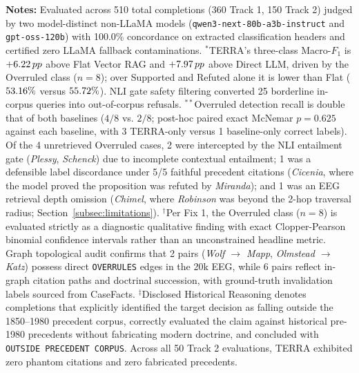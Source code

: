 \raggedright \fontsize{8.5}{10.5}\selectfont \textbf{Notes:} Evaluated across 510 total completions (360 Track 1, 150 Track 2) judged by two model-distinct non-LLaMA models (\texttt{qwen3-next-80b-a3b-instruct} and \texttt{gpt-oss-120b}) with 100.0\% concordance on extracted classification headers and certified zero LLaMA fallback contaminations.
$^*$TERRA's three-class Macro-$F_1$ is $+6.22\,pp$ above Flat Vector RAG and $+7.97\,pp$ above Direct LLM, driven by the Overruled class ($n=8$); over Supported and Refuted alone it is lower than Flat ($53.16\%$ versus $55.72\%$). NLI gate safety filtering converted 25 borderline in-corpus queries into out-of-corpus refusals.
$^{**}$Overruled detection recall is double that of both baselines ($4/8$ vs. $2/8$; post-hoc paired exact McNemar $p=0.625$ against each baseline, with 3 TERRA-only versus 1 baseline-only correct labels). Of the 4 unretrieved Overruled cases, 2 were intercepted by the NLI entailment gate (\textit{Plessy}, \textit{Schenck}) due to incomplete contextual entailment; 1 was a defensible label discordance under 5/5 faithful precedent citations (\textit{Cicenia}, where the model proved the proposition was refuted by \textit{Miranda}); and 1 was an EEG retrieval depth omission (\textit{Chimel}, where \textit{Robinson} was beyond the 2-hop traversal radius; Section~\ref{subsec:limitations}).
$^\dagger$Per Fix 1, the Overruled class ($n=8$) is evaluated strictly as a diagnostic qualitative finding with exact Clopper-Pearson binomial confidence intervals rather than an unconstrained headline metric. Graph topological audit confirms that 2 pairs (\textit{Wolf $\to$ Mapp}, \textit{Olmstead $\to$ Katz}) possess direct \texttt{OVERRULES} edges in the 20k EEG, while 6 pairs reflect in-graph citation paths and doctrinal succession, with ground-truth invalidation labels sourced from CaseFacts.
$^\ddagger$Disclosed Historical Reasoning denotes completions that explicitly identified the target decision as falling outside the 1850--1980 precedent corpus, correctly evaluated the claim against historical pre-1980 precedents without fabricating modern doctrine, and concluded with \texttt{OUTSIDE PRECEDENT CORPUS}. Across all 50 Track 2 evaluations, TERRA exhibited zero phantom citations and zero fabricated precedents.
\endgroup


